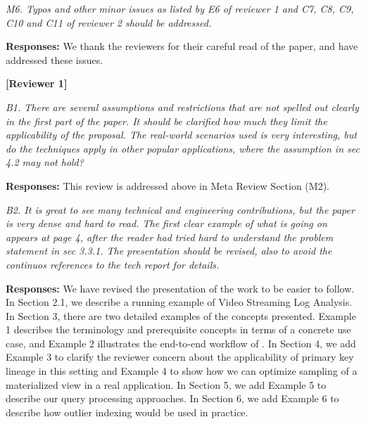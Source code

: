 \vspace{1em}
\emph{M6. Typos and other minor issues as listed by E6 of reviewer 1 and C7, C8, C9, C10 and C11 of reviewer 2 should be addressed.}

\vspace{.25em}

{\bf Responses:} We thank the reviewers for their careful read of the paper, and have addressed these issues.





\vspace{2em}
\noindent\textbf{[Reviewer 1]}
\vspace{1em}

\emph{B1. There are several assumptions and restrictions that are not spelled out clearly in the first part of the paper. It should be clarified how much they limit the applicability of the proposal. The real-world scenarios used is very interesting, but do the techniques apply in other popular applications, where the assumption in sec 4.2 may not hold?}

\vspace{.25em}

{\bf Responses:} This review is addressed above in Meta Review Section (M2).

\vspace{1em}
\emph{B2. It is great to see many technical and engineering contributions, but the paper is very dense and hard to read. The first clear example of what is going on appears at page 4, after the reader had tried hard to understand the problem statement in sec 3.3.1. The presentation should be revised, also to avoid the continuos references to the tech report for details.}

\vspace{.25em}

{\bf Responses:} We have revised the presentation of the work to be easier to follow. In Section 2.1, we describe a running example of Video Streaming Log Analysis. In Section 3, there are two detailed examples of the concepts presented. Example 1 describes the terminology and prerequisite concepts in terms of a concrete use case, and Example 2 illustrates the end-to-end workflow of \svc. In Section 4, we add Example 3 to clarify the reviewer concern about the applicability of primary key lineage in this setting and Example 4 to show how we can optimize sampling of a materialized view in a real application. In Section 5, we add Example 5 to describe our query processing approaches. In Section 6, we add Example 6 to describe how outlier indexing would be used in practice. 

